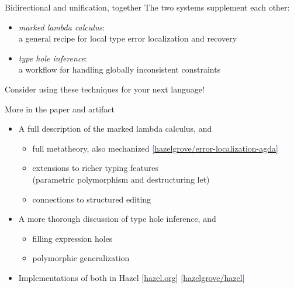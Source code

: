 \begin{frame}{Bidirectional and unification, together}
  The two systems supplement each other: \\[1em]

  \pause
  \begin{itemize}
    \item \emph{marked lambda calculus}: \\
      a general recipe for local type error localization and recovery

      \pause
    \item \emph{type hole inference}: \\
      a workflow for handling globally inconsistent constraints
  \end{itemize}

  \vspace{1em}
  \pause
  Consider using these techniques for your next language!
\end{frame}

\begin{frame}{More in the paper and artifact}
  \begin{itemize}
    \item A full description of the marked lambda calculus\pause, and

      \begin{itemize}
        \item full metatheory\pause, also mechanized
          \textcolor{MidnightBlue}{[\href{https://github.com/hazelgrove/error-localization-agda}{hazelgrove/error-localization-agda}]}

          \pause
        \item extensions to richer typing features \\ \pause
          (parametric polymorphism and destructuring let)

          \pause
        \item connections to structured editing
      \end{itemize}

      \pause
    \item A more thorough discussion of type hole inference\pause, and

      \begin{itemize}
        \item filling expression holes

          \pause
        \item polymorphic generalization
      \end{itemize}

      \pause
    \item Implementations of both in Hazel
      \textcolor{BrickRed}{\small[\href{https://hazel.org}{hazel.org}]}
      \textcolor{MidnightBlue}{\small[\href{https://github.com/hazelgrove/hazel}{hazelgrove/hazel}]}
  \end{itemize}
\end{frame}
